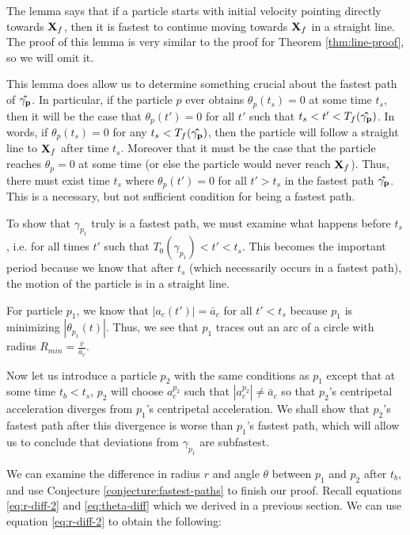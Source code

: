 The lemma says that if a particle starts with initial velocity pointing directly towards $\mathbf{X}_f$, then it is fastest to continue moving towards $\mathbf{X}_f$ in a straight line. The proof of this lemma is very similar to the proof for Theorem \ref{thm:line-proof}, so we will omit it.

This lemma does allow us to determine something crucial about the fastest path of $\mathbf{\hat{\gamma_{p}}}$. In particular, if the particle $p$ ever obtains $\theta_p(t_s) = 0$ at some time $t_s$, then it will be the case that $\theta_p(t') = 0$ for all $t'$ such that $t_s < t' < T_f(\mathbf{\hat{\gamma_p}})$. In words, if $\theta_p(t_s) = 0$ for any $t_s < T_f(\mathbf{\hat{\gamma_p}})$, then the particle will follow a straight line to $\mathbf{X}_f$ after time $t_s$. Moreover that it must be the case that the particle reaches $\theta_p = 0$ at some time (or else the particle would never reach $\mathbf{X}_f$). Thus, there must exist time $t_s$ where $\theta_p(t') = 0$ for all $t' > t_s$ in the fastest path $\mathbf{\hat{\gamma_p}}$. This is a necessary, but not sufficient condition for being a fastest path.

To show that $\gamma_{p_1}$ truly is a fastest path, we must examine what happens before $t_s$, i.e. for all times $t'$ such that $T_0(\gamma_{p_1}) < t' < t_s$. This becomes the important period because we know that after $t_s$ (which necessarily occurs in a fastest path), the motion of the particle is in a straight line.

For particle $p_1$, we know that $|a_c(t')| = \bar{a}_c$ for all $t' < t_s$ because $p_1$ is minimizing $|\theta_{p_1}(t)|$. Thus, we see that $p_1$ traces out an arc of a circle with radius $R_{min} = \frac{\bar{v}}{\bar{a}_c}$.

Now let us introduce a particle $p_2$ with the same conditions as $p_1$ except that at some time $t_b < t_s$, $p_2$ will choose $a^{p_2}_c$ such that $|a^{p_2}_c| \neq \bar{a}_c$ so that $p_2$'s centripetal acceleration diverges from $p_1$'s centripetal acceleration. We shall show that $p_2$'s fastest path after this divergence is worse than $p_1$'s fastest path, which will allow us to conclude that deviations from $\gamma_{p_1}$ are subfastest.

We can examine the difference in radius $r$ and angle $\theta$ between $p_1$ and $p_2$ after $t_b$, and use Conjecture \ref{conjecture:fastest-paths} to finish our proof. Recall equations \ref{eq:r-diff-2} and \ref{eq:theta-diff} which we derived in a previous section. We can use equation \ref{eq:r-diff-2} to obtain the following:

